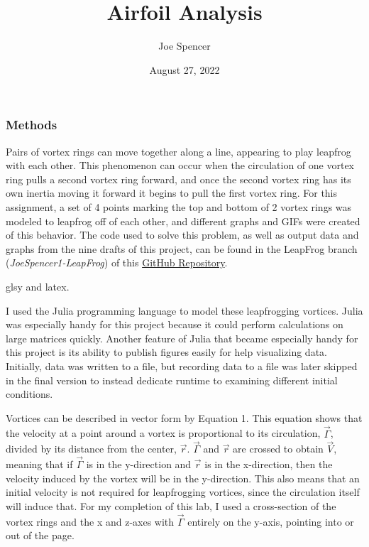 \documentclass{article}
\begin{document}
\author{Joe Spencer}
\title{Airfoil Analysis}
\date{August 27, 2022}
\maketitle

\subsubsection*{Methods}
Pairs of vortex rings can move together along a line, appearing to play leapfrog with each other. This phenomenon can occur when the circulation of one vortex ring pulls a second vortex ring forward, and once the second vortex ring has its own inertia moving it forward it begins to pull the first vortex ring. For this assignment, a set of 4 points marking the top and bottom of 2 vortex rings was modeled to leapfrog off of each other, and different graphs and GIFs were created of this behavior. The code used to solve this problem, as well as output data and graphs from the nine drafts of this project, can be found in the LeapFrog branch (\emph{JoeSpencer1-LeapFrog}) of this \href{https://github.com/JoeSpencer1/497R-Projects.git}{GitHub Repository}. \newline

\gls{glsy} and \gls{latex}.

I used the Julia programming language to model these leapfrogging vortices. Julia was especially handy for this project because it could perform calculations on large matrices quickly. Another feature of Julia that became especially handy for this project is its ability to publish figures easily for help visualizing data. Initially, data was written to a file, but recording data to a file was later skipped in the final version to instead dedicate runtime to examining different initial conditions.\newline

Vortices can be described in vector form by Equation 1. This equation shows that the velocity at a point around a vortex is proportional to its circulation, $\vec{\Gamma}$, divided by its distance from the center, $\vec{r}$. $\vec{\Gamma}$ and $\vec{r}$ are crossed to obtain $\vec{V}$, meaning that if $\vec{\Gamma}$ is in the y-direction and $\vec{r}$ is in the x-direction, then the velocity induced by the vortex will be in the y-direction. This also means that an initial velocity is not required for leapfrogging vortices, since the circulation itself will induce that. For my completion of this lab, I used a cross-section of the vortex rings and the x and z-axes with $\vec{\Gamma}$ entirely on the y-axis, pointing into or out of the page.  \newline
\end{document}

